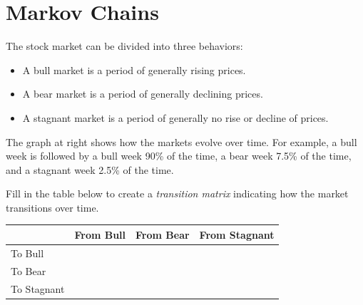 \newpage\section{Markov Chains}
\begin{problem}\label{prob:bull_bear}
    The stock market can be divided into three behaviors:

    \begin{minipage}{0.4\columnwidth}
    \begin{itemize}
        \item A bull market is a period of generally rising prices.
        \item A bear market is a period of generally declining prices.
        \item A stagnant market is a period of generally no rise or decline of prices.
    \end{itemize}
    The graph at right shows how the markets evolve over time. For example, a bull week is
    followed by a bull week 90\% of the time, a bear week 7.5\% of the time, and a
    stagnant week 2.5\% of the time.
\end{minipage}
\begin{minipage}{0.55\columnwidth}
    \begin{center}
    \end{center}
\end{minipage}

    \ba
        \item Fill in the table below to create a {\it transition matrix} indicating how
            the market transitions over time.
            \begin{center}
                \begin{tabular}{l|ccc}
                    & From Bull & From Bear & From Stagnant \\ \hline 
                    To Bull & & & \\
                    To Bear & & & \\
                    To Stagnant & & & 
                \end{tabular}
            \end{center}


\end{problem}
